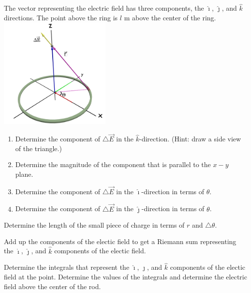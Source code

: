 \begin{problem}
\begin{subproblem}
    \clearpage

     \item The vector representing the electric field has three components, the $\hat{\imath}$, $\hat{\jmath}$, and $\hat{k}$ directions.
        The point above the ring is $l$ m above the center of the ring.
       \includegraphics[width=15em]{blender/ringCharge-components}
       \begin{enumerate}
         \item Determine the component of $\triangle \vec{E}$ in the $\hat{k}$-direction. (Hint: draw a side view of the triangle.)
         \vfill
         \item Determine the magnitude of the component that is parallel to the $x-y$ plane.
         \vfill
         \item Determine the component of $\triangle \vec{E}$ in the $\hat{\imath}$-direction in terms of $\theta$.
         \vfill
         \item Determine the component of $\triangle \vec{E}$ in the $\hat{\jmath}$-direction in terms of $\theta$.
         \vfill
       \end{enumerate}
       \clearpage
     \item Determine the length of the small piece of charge in terms of $r$ and $\triangle\theta$.
         \vspace{2em}
     \item Add up the components of the electic field to get a Riemann sum representing the
      $\hat{\imath}$, $\hat{\jmath}$, and $\hat{k}$ components of the electic field.
      \vfill
    \item Determine the integrals that represent the $\hat{\imath}$, $\hat{\jmath}$, and $\hat{k}$ components of the electic field at the point.
      Determine the values of the integrals and determine the electric field above the center of the rod.
      \vfill
      \vfill
      \vfill
  \end{subproblem}

\end{problem}

